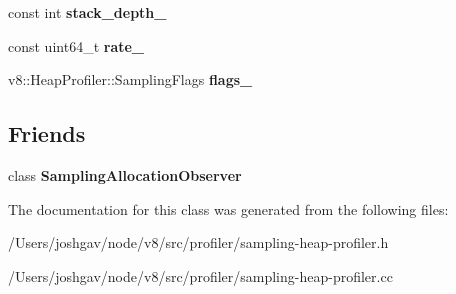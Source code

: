\begin{DoxyCompactItemize}
\item 
const int {\bfseries stack\+\_\+depth\+\_\+}\hypertarget{classv8_1_1internal_1_1_sampling_heap_profiler_a09a429f7195cc6d77c206b197a825dbf}{}\label{classv8_1_1internal_1_1_sampling_heap_profiler_a09a429f7195cc6d77c206b197a825dbf}

\item 
const uint64\+\_\+t {\bfseries rate\+\_\+}\hypertarget{classv8_1_1internal_1_1_sampling_heap_profiler_aa553490548f4fcd71bf8e59dd7506c09}{}\label{classv8_1_1internal_1_1_sampling_heap_profiler_aa553490548f4fcd71bf8e59dd7506c09}

\item 
v8\+::\+Heap\+Profiler\+::\+Sampling\+Flags {\bfseries flags\+\_\+}\hypertarget{classv8_1_1internal_1_1_sampling_heap_profiler_a23119a85d3835257a35afb67b91ea4e1}{}\label{classv8_1_1internal_1_1_sampling_heap_profiler_a23119a85d3835257a35afb67b91ea4e1}

\end{DoxyCompactItemize}
\subsection*{Friends}
\begin{DoxyCompactItemize}
\item 
class {\bfseries Sampling\+Allocation\+Observer}\hypertarget{classv8_1_1internal_1_1_sampling_heap_profiler_ab72eef16330b03793259e4fd1446dc8d}{}\label{classv8_1_1internal_1_1_sampling_heap_profiler_ab72eef16330b03793259e4fd1446dc8d}

\end{DoxyCompactItemize}


The documentation for this class was generated from the following files\+:\begin{DoxyCompactItemize}
\item 
/\+Users/joshgav/node/v8/src/profiler/sampling-\/heap-\/profiler.\+h\item 
/\+Users/joshgav/node/v8/src/profiler/sampling-\/heap-\/profiler.\+cc\end{DoxyCompactItemize}
